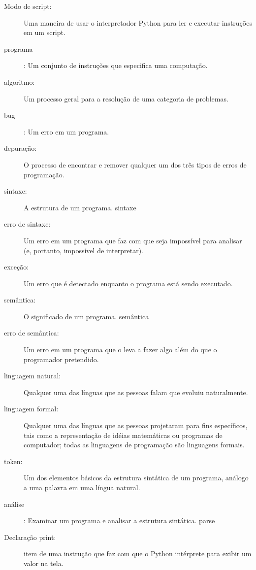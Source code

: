 \documentclass[10pt]{book}
\begin{document}
\begin{description}
\item[Modo de script:] Uma maneira de usar o interpretador Python para ler
e executar instruções em um script.

\item[programa]: Um conjunto de instruções que especifica uma computação.

\item[algoritmo:] Um processo geral para a resolução de uma categoria de
problemas.

\item[bug]: Um erro em um programa.

\item[depuração:] O processo de encontrar e remover qualquer um dos
três tipos de erros de programação.

\item[sintaxe:] A estrutura de um programa.
\index{} sintaxe

\item[erro de sintaxe:] Um erro em um programa que faz com que seja impossível
para analisar (e, portanto, impossível de interpretar).

\item[exceção:] Um erro que é detectado enquanto o programa está sendo executado.

\item[semântica:] O significado de um programa.
\index{} semântica

\item[erro de semântica:] Um erro em um programa que o leva a fazer algo
além do que o programador pretendido.

\item[linguagem natural:] Qualquer uma das línguas que as pessoas falam que
evoluiu naturalmente.

\item[linguagem formal:] Qualquer uma das línguas que as pessoas projetaram
para fins específicos, tais como a representação de idéias matemáticas ou
programas de computador; todas as linguagens de programação são linguagens formais.

\item[token:] Um dos elementos básicos da estrutura sintática de
um programa, análogo a uma palavra em uma língua natural.

\item[análise]: Examinar um programa e analisar a estrutura sintática.
\index{} parse

\item[Declaração print:] item de uma instrução que faz com que o Python
intérprete para exibir um valor na tela.


\end{description}
\end{document}
